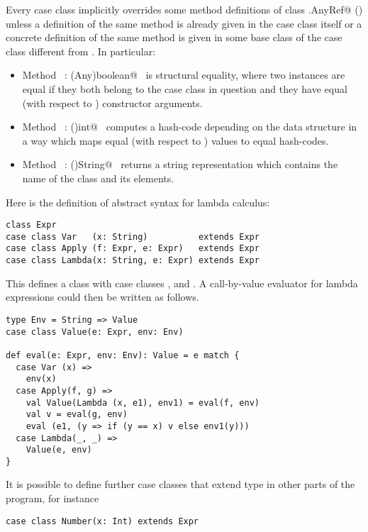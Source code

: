 Every case class implicitly overrides some method definitions of class
\lstinline@scala.AnyRef@ () unless a definition of the same
method is already given in the case class itself or a concrete
definition of the same method is given in some base class of the case
class different from . In particular:
\begin{itemize}
\item[] Method ~\lstinline@equals: (Any)boolean@~ is structural equality, where two
instances are equal if they both belong to the case class in question and they
have equal (with respect to ) constructor arguments.
\item[] Method ~\lstinline@hashCode: ()int@~ computes a hash-code
depending on the data structure in a way which maps equal (with respect to
) values to equal hash-codes.
\item[] Method ~\lstinline@toString: ()String@~ returns a string representation which
contains the name of the class and its elements.
\end{itemize}

\example Here is the definition of abstract syntax for lambda
calculus:

\begin{lstlisting}
class Expr 
case class Var   (x: String)          extends Expr
case class Apply (f: Expr, e: Expr)   extends Expr
case class Lambda(x: String, e: Expr) extends Expr 
\end{lstlisting}
This defines a class  with case classes
,  and . A call-by-value evaluator for lambda
expressions could then be written as follows.

\begin{lstlisting}
type Env = String => Value 
case class Value(e: Expr, env: Env) 

def eval(e: Expr, env: Env): Value = e match {
  case Var (x) =>
    env(x)
  case Apply(f, g) =>
    val Value(Lambda (x, e1), env1) = eval(f, env) 
    val v = eval(g, env) 
    eval (e1, (y => if (y == x) v else env1(y)))
  case Lambda(_, _) =>
    Value(e, env)
}
\end{lstlisting}

It is possible to define further case classes that extend type
 in other parts of the program, for instance
\begin{lstlisting}
case class Number(x: Int) extends Expr 
\end{lstlisting}

